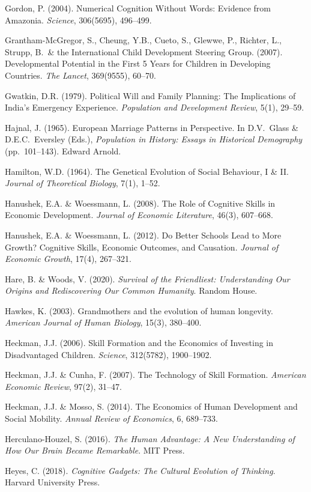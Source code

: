 \documentclass[12pt,letterpaper]{article}
\begin{document}
Gordon, P. (2004). Numerical Cognition Without Words: Evidence from
Amazonia. \emph{Science}, 306(5695), 496--499.

Grantham-McGregor, S., Cheung, Y.B., Cueto, S., Glewwe, P., Richter,
L., Strupp, B.\ \& the International Child Development Steering Group.
(2007). Developmental Potential in the First 5 Years for Children in
Developing Countries. \emph{The Lancet}, 369(9555), 60--70.

Gwatkin, D.R. (1979). Political Will and Family Planning: The
Implications of India's Emergency Experience. \emph{Population and
Development Review}, 5(1), 29--59.

Hajnal, J. (1965). European Marriage Patterns in Perspective. In
D.V.~Glass \& D.E.C.~Eversley (Eds.), \emph{Population in History:
Essays in Historical Demography} (pp.~101--143). Edward Arnold.

Hamilton, W.D. (1964). The Genetical Evolution of Social Behaviour, I
\& II. \emph{Journal of Theoretical Biology}, 7(1), 1--52.

Hanushek, E.A. \& Woessmann, L. (2008). The Role of Cognitive Skills in
Economic Development. \emph{Journal of Economic Literature}, 46(3),
607--668.

Hanushek, E.A. \& Woessmann, L. (2012). Do Better Schools Lead to More
Growth? Cognitive Skills, Economic Outcomes, and Causation.
\emph{Journal of Economic Growth}, 17(4), 267--321.

Hare, B. \& Woods, V. (2020). \emph{Survival of the Friendliest:
Understanding Our Origins and Rediscovering Our Common Humanity}.
Random House.

Hawkes, K. (2003). Grandmothers and the evolution of human
longevity. \emph{American Journal of Human Biology}, 15(3), 380--400.

Heckman, J.J. (2006). Skill Formation and the Economics of Investing
in Disadvantaged Children. \emph{Science}, 312(5782), 1900--1902.

Heckman, J.J. \& Cunha, F. (2007). The Technology of Skill Formation.
\emph{American Economic Review}, 97(2), 31--47.

Heckman, J.J. \& Mosso, S. (2014). The Economics of Human Development
and Social Mobility. \emph{Annual Review of Economics}, 6, 689--733.

Herculano-Houzel, S. (2016). \emph{The Human Advantage: A New
Understanding of How Our Brain Became Remarkable}. MIT Press.

Heyes, C. (2018). \emph{Cognitive Gadgets: The Cultural Evolution of
Thinking}. Harvard University Press.
\end{document}
